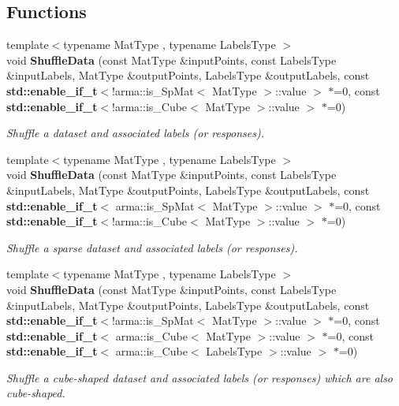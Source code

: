 \subsection*{Functions}
\begin{DoxyCompactItemize}
\item 
{\footnotesize template$<$typename Mat\+Type , typename Labels\+Type $>$ }\\void \textbf{ Shuffle\+Data} (const Mat\+Type \&input\+Points, const Labels\+Type \&input\+Labels, Mat\+Type \&output\+Points, Labels\+Type \&output\+Labels, const \textbf{ std\+::enable\+\_\+if\+\_\+t}$<$!arma\+::is\+\_\+\+Sp\+Mat$<$ Mat\+Type $>$\+::value $>$ $\ast$=0, const \textbf{ std\+::enable\+\_\+if\+\_\+t}$<$!arma\+::is\+\_\+\+Cube$<$ Mat\+Type $>$\+::value $>$ $\ast$=0)
\begin{DoxyCompactList}\small\item\em Shuffle a dataset and associated labels (or responses). \end{DoxyCompactList}\item 
{\footnotesize template$<$typename Mat\+Type , typename Labels\+Type $>$ }\\void \textbf{ Shuffle\+Data} (const Mat\+Type \&input\+Points, const Labels\+Type \&input\+Labels, Mat\+Type \&output\+Points, Labels\+Type \&output\+Labels, const \textbf{ std\+::enable\+\_\+if\+\_\+t}$<$ arma\+::is\+\_\+\+Sp\+Mat$<$ Mat\+Type $>$\+::value $>$ $\ast$=0, const \textbf{ std\+::enable\+\_\+if\+\_\+t}$<$!arma\+::is\+\_\+\+Cube$<$ Mat\+Type $>$\+::value $>$ $\ast$=0)
\begin{DoxyCompactList}\small\item\em Shuffle a sparse dataset and associated labels (or responses). \end{DoxyCompactList}\item 
{\footnotesize template$<$typename Mat\+Type , typename Labels\+Type $>$ }\\void \textbf{ Shuffle\+Data} (const Mat\+Type \&input\+Points, const Labels\+Type \&input\+Labels, Mat\+Type \&output\+Points, Labels\+Type \&output\+Labels, const \textbf{ std\+::enable\+\_\+if\+\_\+t}$<$!arma\+::is\+\_\+\+Sp\+Mat$<$ Mat\+Type $>$\+::value $>$ $\ast$=0, const \textbf{ std\+::enable\+\_\+if\+\_\+t}$<$ arma\+::is\+\_\+\+Cube$<$ Mat\+Type $>$\+::value $>$ $\ast$=0, const \textbf{ std\+::enable\+\_\+if\+\_\+t}$<$ arma\+::is\+\_\+\+Cube$<$ Labels\+Type $>$\+::value $>$ $\ast$=0)
\begin{DoxyCompactList}\small\item\em Shuffle a cube-\/shaped dataset and associated labels (or responses) which are also cube-\/shaped. \end{DoxyCompactList}\item 

\end{DoxyCompactItemize}
